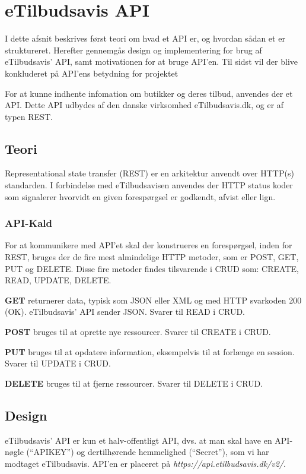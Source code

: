 \section{eTilbudsavis API}\label{api}
I dette afsnit beskrives først teori om hvad et API er, og hvordan sådan et er struktureret.
Herefter gennemgås design og implementering for brug af eTilbudsavis' API, samt motivationen for at bruge API'en. Til sidst vil der blive konkluderet på API'ens betydning for projektet

For at kunne indhente infomation om butikker og deres tilbud, anvendes der et API.
Dette API udbydes af den danske virksomhed eTilbudsavis.dk, og er af typen REST.

\subsection{Teori}
Representational state transfer (REST) er en arkitektur anvendt over HTTP(s) standarden. 
I forbindelse med eTilbudsavisen anvendes der HTTP status koder som signalerer hvorvidt en given forespørgsel er godkendt, afvist eller lign.

\subsubsection{API-Kald}
For at kommunikere med API'et skal der konstrueres en forespørgsel, inden for REST, bruges der de fire mest almindelige HTTP metoder, som er POST, GET, PUT og DELETE.
Disse fire metoder findes tilsvarende i CRUD som: CREATE, READ, UPDATE, DELETE.

\textbf{GET}
returnerer data, typisk som JSON eller XML og med HTTP svarkoden 200 (OK).
eTilbudsavis' API sender JSON.
Svarer til READ i CRUD.

\textbf{POST}
bruges til at oprette nye ressourcer.
Svarer til CREATE i CRUD.

\textbf{PUT}
bruges til at opdatere information, eksempelvis til at forlænge en session.
Svarer til UPDATE i CRUD.

\textbf{DELETE}
bruges til at fjerne ressourcer.
Svarer til DELETE i CRUD.

\subsection{Design}
eTilbudsavis' API er kun et halv-offentligt API, dvs. at man skal have en API-nøgle (``APIKEY'') og dertilhørende hemmelighed (``Secret''), som vi har modtaget eTilbudsavis.
API'en er placeret på \textit{https://api.etilbudsavis.dk/v2/}. \citep{eTilAPI}


